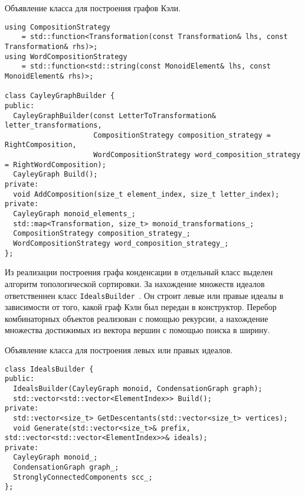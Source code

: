 \documentclass[14pt, russian]{scrartcl}
\begin{document}
\begin{listing}[!htb]
\caption{Объявление класса для построения графов Кэли.}
\label{lst:graph_builder}
  \begin{verbatim}
using CompositionStrategy
    = std::function<Transformation(const Transformation& lhs, const Transformation& rhs)>;
using WordCompositionStrategy
    = std::function<std::string(const MonoidElement& lhs, const MonoidElement& rhs)>;

class CayleyGraphBuilder {
public:
  CayleyGraphBuilder(const LetterToTransformation& letter_transformations,
                     CompositionStrategy composition_strategy = RightComposition,
                     WordCompositionStrategy word_composition_strategy = RightWordComposition);
  CayleyGraph Build();
private:
  void AddComposition(size_t element_index, size_t letter_index);
private:
  CayleyGraph monoid_elements_;
  std::map<Transformation, size_t> monoid_transformations_;
  CompositionStrategy composition_strategy_;
  WordCompositionStrategy word_composition_strategy_;
};
  \end{verbatim}
\end{listing}

Из реализации построения графа конденсации в отдельный класс выделен алгоритм
топологической сортировки. За нахождение множеств идеалов ответственнен класс
\verb|IdealsBuilder|~. Он строит левые или
правые идеалы в зависимости от того, какой граф Кэли был передан в конструктор.
Перебор комбинаторных объектов реализован с помощью рекурсии, а нахождение
множества достижимых из вектора вершин с помощью поиска в ширину.

\begin{listing}[!htb]
\caption{Объявление класса для построения левых или правых идеалов.}
\label{lst:ideals_builder_impl}
  \begin{verbatim}
class IdealsBuilder {
public:
  IdealsBuilder(CayleyGraph monoid, CondensationGraph graph);
  std::vector<std::vector<ElementIndex>> Build();
private:
  std::vector<size_t> GetDescentants(std::vector<size_t> vertices);
  void Generate(std::vector<size_t>& prefix, std::vector<std::vector<ElementIndex>>& ideals);
private:
  CayleyGraph monoid_;
  CondensationGraph graph_;
  StronglyConnectedComponents scc_;
};
  \end{verbatim}
\end{listing}
\end{document}
